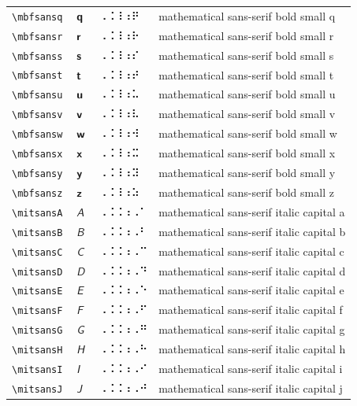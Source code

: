 \documentclass[oneside]{article}
\begin{document}
\begin{longtable}{llll}
\verb|\mbfsansq| & $\mbfsansq$ &  ⠠⠨⠸⠰⠟  & {mathematical sans-serif bold small q} \\[2ex]
\verb|\mbfsansr| & $\mbfsansr$ &  ⠠⠨⠸⠰⠗  & {mathematical sans-serif bold small r} \\[2ex]
\verb|\mbfsanss| & $\mbfsanss$ &  ⠠⠨⠸⠰⠎  & {mathematical sans-serif bold small s} \\[2ex]
\verb|\mbfsanst| & $\mbfsanst$ &  ⠠⠨⠸⠰⠞  & {mathematical sans-serif bold small t} \\[2ex]
\verb|\mbfsansu| & $\mbfsansu$ &  ⠠⠨⠸⠰⠥  & {mathematical sans-serif bold small u} \\[2ex]
\verb|\mbfsansv| & $\mbfsansv$ &  ⠠⠨⠸⠰⠧  & {mathematical sans-serif bold small v} \\[2ex]
\verb|\mbfsansw| & $\mbfsansw$ &  ⠠⠨⠸⠰⠺  & {mathematical sans-serif bold small w} \\[2ex]
\verb|\mbfsansx| & $\mbfsansx$ &  ⠠⠨⠸⠰⠭  & {mathematical sans-serif bold small x} \\[2ex]
\verb|\mbfsansy| & $\mbfsansy$ &  ⠠⠨⠸⠰⠽  & {mathematical sans-serif bold small y} \\[2ex]
\verb|\mbfsansz| & $\mbfsansz$ &  ⠠⠨⠸⠰⠵  & {mathematical sans-serif bold small z} \\[2ex]
\verb|\mitsansA| & $\mitsansA$ &  ⠠⠨⠨⠰⠠⠁  & {mathematical sans-serif italic capital a} \\[2ex]
\verb|\mitsansB| & $\mitsansB$ &  ⠠⠨⠨⠰⠠⠃  & {mathematical sans-serif italic capital b} \\[2ex]
\verb|\mitsansC| & $\mitsansC$ &  ⠠⠨⠨⠰⠠⠉  & {mathematical sans-serif italic capital c} \\[2ex]
\verb|\mitsansD| & $\mitsansD$ &  ⠠⠨⠨⠰⠠⠙  & {mathematical sans-serif italic capital d} \\[2ex]
\verb|\mitsansE| & $\mitsansE$ &  ⠠⠨⠨⠰⠠⠑  & {mathematical sans-serif italic capital e} \\[2ex]
\verb|\mitsansF| & $\mitsansF$ &  ⠠⠨⠨⠰⠠⠋  & {mathematical sans-serif italic capital f} \\[2ex]
\verb|\mitsansG| & $\mitsansG$ &  ⠠⠨⠨⠰⠠⠛  & {mathematical sans-serif italic capital g} \\[2ex]
\verb|\mitsansH| & $\mitsansH$ &  ⠠⠨⠨⠰⠠⠓  & {mathematical sans-serif italic capital h} \\[2ex]
\verb|\mitsansI| & $\mitsansI$ &  ⠠⠨⠨⠰⠠⠊  & {mathematical sans-serif italic capital i} \\[2ex]
\verb|\mitsansJ| & $\mitsansJ$ &  ⠠⠨⠨⠰⠠⠚  & {mathematical sans-serif italic capital j} \\[2ex]

\end{longtable}
\end{document}
